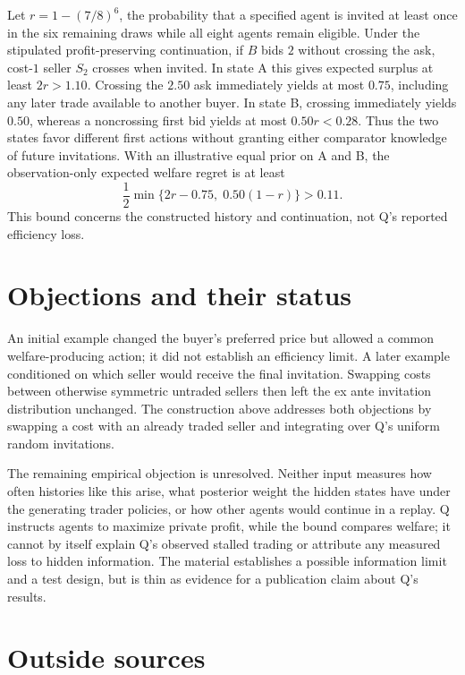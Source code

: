 \documentclass{article}
\begin{document}
Let \(r=1-(7/8)^6\), the probability that a specified agent is invited at least once in the six remaining draws while all eight agents remain eligible. Under the stipulated profit-preserving continuation, if \(B\) bids \(2\) without crossing the ask, cost-\(1\) seller \(S_2\) crosses when invited. In state A this gives expected surplus at least \(2r>1.10\). Crossing the \(2.50\) ask immediately yields at most \(0.75\), including any later trade available to another buyer. In state B, crossing immediately yields \(0.50\), whereas a noncrossing first bid yields at most \(0.50r<0.28\). Thus the two states favor different first actions without granting either comparator knowledge of future invitations. With an illustrative equal prior on A and B, the observation-only expected welfare regret is at least
\[
\frac{1}{2}\min\{2r-0.75,\;0.50(1-r)\}>0.11.
\]
This bound concerns the constructed history and continuation, not Q's reported efficiency loss.

\section{Objections and their status}

An initial example changed the buyer's preferred price but allowed a common welfare-producing action; it did not establish an efficiency limit. A later example conditioned on which seller would receive the final invitation. Swapping costs between otherwise symmetric untraded sellers then left the ex ante invitation distribution unchanged. The construction above addresses both objections by swapping a cost with an already traded seller and integrating over Q's uniform random invitations.

The remaining empirical objection is unresolved. Neither input measures how often histories like this arise, what posterior weight the hidden states have under the generating trader policies, or how other agents would continue in a replay. Q instructs agents to maximize private profit, while the bound compares welfare; it cannot by itself explain Q's observed stalled trading or attribute any measured loss to hidden information. The material establishes a possible information limit and a test design, but is thin as evidence for a publication claim about Q's results.

\section{Outside sources}
\end{document}
